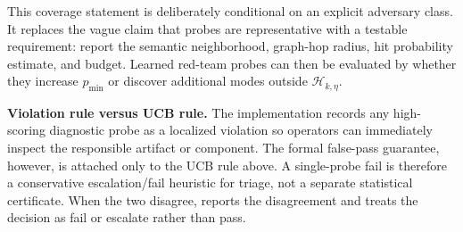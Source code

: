 This coverage statement is deliberately conditional on an explicit adversary class. It replaces the vague claim that probes are representative with a testable requirement: report the semantic neighborhood, graph-hop radius, hit probability estimate, and budget. Learned red-team probes can then be evaluated by whether they increase $p_{\min}$ or discover additional modes outside $\mathcal{H}_{k,\eta}$.

\textbf{Violation rule versus UCB rule.}
The implementation records any high-scoring diagnostic probe as a localized violation so operators can immediately inspect the responsible artifact or component. The formal false-pass guarantee, however, is attached only to the UCB rule above. A single-probe fail is therefore a conservative escalation/fail heuristic for triage, not a separate statistical certificate. When the two disagree, \method{} reports the disagreement and treats the decision as fail or escalate rather than pass.
